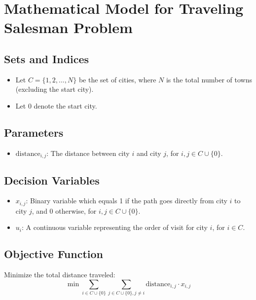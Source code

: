 \documentclass{article}
\begin{document}
\section*{Mathematical Model for Traveling Salesman Problem}

\subsection*{Sets and Indices}
\begin{itemize}
    \item Let $C = \{1, 2, ..., N\}$ be the set of cities, where $N$ is the total number of towns (excluding the start city).
    \item Let $0$ denote the start city.
\end{itemize}

\subsection*{Parameters}
\begin{itemize}
    \item $\text{distance}_{i,j}$: The distance between city $i$ and city $j$, for $i, j \in C \cup \{0\}$.
\end{itemize}

\subsection*{Decision Variables}
\begin{itemize}
    \item $x_{i,j}$: Binary variable which equals 1 if the path goes directly from city $i$ to city $j$, and 0 otherwise, for $i, j \in C \cup \{0\}$.
    \item $u_i$: A continuous variable representing the order of visit for city $i$, for $i \in C$.
\end{itemize}

\subsection*{Objective Function}
Minimize the total distance traveled:
\begin{equation}
    \min \sum_{i \in C \cup \{0\}} \sum_{j \in C \cup \{0\}, j \neq i} \text{distance}_{i,j} \cdot x_{i,j}
\end{equation}
\end{document}
